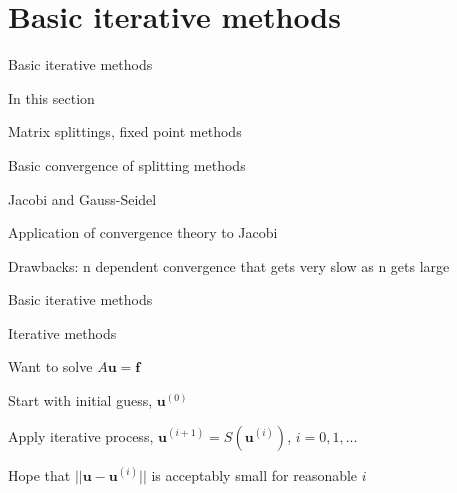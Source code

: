 \documentclass[18pt,xcolor=table]{beamer}
\begin{document}

\section{Basic iterative methods}

\begin{frame}{Basic iterative methods}
\begin{block}{In this section}
\bit
\item Matrix splittings, fixed point methods
\item Basic convergence of splitting methods
\item Jacobi and Gauss-Seidel
\item Application of convergence theory to Jacobi
\item Drawbacks: n dependent convergence that gets very slow as n gets large
\eit
\end{block}
\end{frame}


\begin{frame}{Basic iterative methods}
\begin{block}{Iterative methods}
\bit
\item Want to solve $A\mathbf{u} = \mathbf{f}$
\item Start with initial guess, $\mathbf{u}^{(0)}$
\item Apply iterative process, $\mathbf{u}^{(i+1)} = S(\mathbf{u}^{(i)})$, $i =0,1,...$
\item Hope that $||\mathbf{u} - \mathbf{u}^{(i)}||$ is acceptably small for reasonable $i$
\eit
\end{block}
\end{frame}
\end{document}
